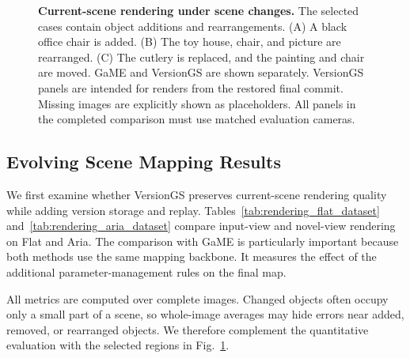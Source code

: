 \begin{figure}[t]
    \caption{
        \textbf{Current-scene rendering under scene changes.}
        The selected cases contain object additions and rearrangements.
        (A) A black office chair is added.
        (B) The toy house, chair, and picture are rearranged.
        (C) The cutlery is replaced, and the painting and chair are moved.
        GaME and VersionGS are shown separately.
        VersionGS panels are intended for renders from the restored
        final commit.
        Missing images are explicitly shown as placeholders.
        All panels in the completed comparison must use matched
        evaluation cameras.
    }
    \label{fig:qualitative_results}
\end{figure}


\subsection{Evolving Scene Mapping Results}
\label{sec:evolving_mapping_results}

We first examine whether VersionGS preserves current-scene
rendering quality while adding version storage and replay.
Tables~\ref{tab:rendering_flat_dataset}
and~\ref{tab:rendering_aria_dataset}
compare input-view and novel-view rendering on Flat and Aria.
The comparison with GaME is particularly important because
both methods use the same mapping backbone.
It measures the effect of the additional parameter-management
rules on the final map.

All metrics are computed over complete images.
Changed objects often occupy only a small part of a scene,
so whole-image averages may hide errors near added, removed,
or rearranged objects.
We therefore complement the quantitative evaluation with
the selected regions in Fig.~\ref{fig:qualitative_results}.


